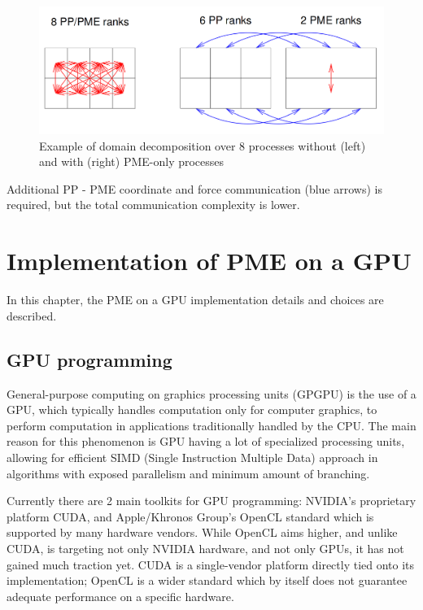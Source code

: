 \documentclass[12pt,a4paper]{report}
\newcommand{\draft}[1]{#1}
\begin{document}
\begin{figure}
    \centering
    \includegraphics[width=1\textwidth]{pics/DD.png}
    \caption{Example of domain decomposition over 8 processes without (left) and with (right) PME-only processes}
    \label{fig:DD}
\end{figure}
\FloatBarrier

Additional PP - PME coordinate and force communication (blue arrows) is required, but the total communication complexity is lower.


\newpage
\chapter{Implementation of PME on a GPU}

In this chapter, the PME on a GPU implementation details and choices are described.

\section{GPU programming}

General-purpose computing on graphics processing units (GPGPU) is the use of a GPU, which typically handles computation only for computer graphics, to perform computation in applications traditionally handled by the CPU. The main reason for this phenomenon is GPU having a lot of specialized processing units, allowing for efficient SIMD (Single Instruction Multiple Data) approach in algorithms with exposed parallelism and minimum amount of branching.

Currently there are 2 main toolkits for GPU programming: NVIDIA's proprietary platform CUDA, and Apple/Khronos Group's OpenCL standard which is supported by many hardware vendors. While OpenCL aims higher, and unlike CUDA, is targeting not only NVIDIA hardware, and not only GPUs, it has not gained much traction yet. CUDA is a single-vendor platform directly tied onto its implementation; OpenCL is a wider standard which by itself does not guarantee adequate performance on a specific hardware.
\end{document}
